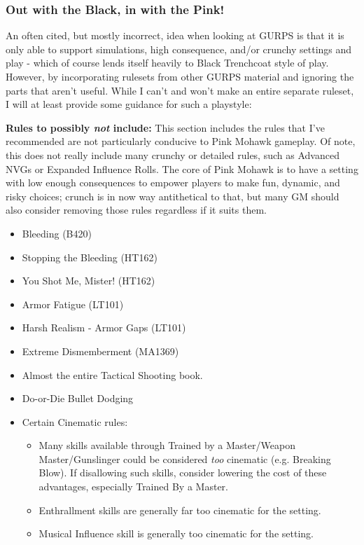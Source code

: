 \begin{multicols*}{2}
	\subsubsection{Out with the Black, in with the Pink!}
	
	An often cited, but mostly incorrect, idea when looking at GURPS is that it is only able to support simulations, high consequence, and/or crunchy settings and play - which of course lends itself heavily to Black Trenchcoat style of play. However, by incorporating rulesets from other GURPS material and ignoring the parts that aren't useful. While I can't and won't make an entire separate ruleset, I will at least provide some guidance for such a playstyle:
	
	\textbf{Rules to possibly \textit{not} include:}
	This section includes the rules that I've recommended are not particularly conducive to Pink Mohawk gameplay. Of note, this does not really include many crunchy or detailed rules, such as Advanced NVGs or Expanded Influence Rolls. The core of Pink Mohawk is to have a setting with low enough consequences to empower players to make fun, dynamic, and risky choices; crunch is in now way antithetical to that, but many GM should also consider removing those rules regardless if it suits them.
	\begin{itemize}
		\itemsep 0pt
		\item Bleeding (B420)
		\item Stopping the Bleeding (HT162)
		\item You Shot Me, Mister! (HT162)
		\item Armor Fatigue (LT101)
		\item Harsh Realism - Armor Gaps (LT101)
		\item Extreme Dismemberment (MA1369)
		\item Almost the entire Tactical Shooting book.
		\item Do-or-Die Bullet Dodging
		\item Certain Cinematic rules:
		\begin{itemize}
			\itemsep 0pt
			\item Many skills available through Trained by a Master/Weapon Master/Gunslinger could be considered \textit{too} cinematic (e.g. Breaking Blow). If disallowing such skills, consider lowering the cost of these advantages, especially Trained By a Master.
			\item Enthrallment skills are generally far too cinematic for the setting.
			\item Musical Influence skill is generally too cinematic for the setting.
		\end{itemize}
	\end{itemize}
	

\end{multicols*}
